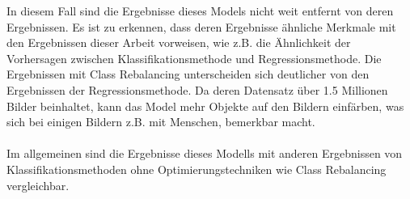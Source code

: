 In diesem Fall sind die Ergebnisse dieses Models nicht weit entfernt von deren Ergebnissen. Es ist zu erkennen, dass deren Ergebnisse ähnliche
Merkmale mit den Ergebnissen dieser Arbeit vorweisen, wie z.B. die Ähnlichkeit der Vorhersagen zwischen Klassifikationsmethode und Regressionsmethode.
Die Ergebnissen mit Class Rebalancing unterscheiden sich deutlicher von den Ergebnissen der Regressionsmethode. 
Da deren Datensatz über 1.5 Millionen Bilder beinhaltet, kann das Model mehr Objekte auf den
Bildern einfärben, was sich bei einigen Bildern z.B. mit Menschen, bemerkbar macht. 
\\
\\
Im allgemeinen sind die Ergebnisse dieses Modells mit anderen Ergebnissen von Klassifikationsmethoden ohne Optimierungstechniken wie Class Rebalancing
vergleichbar.